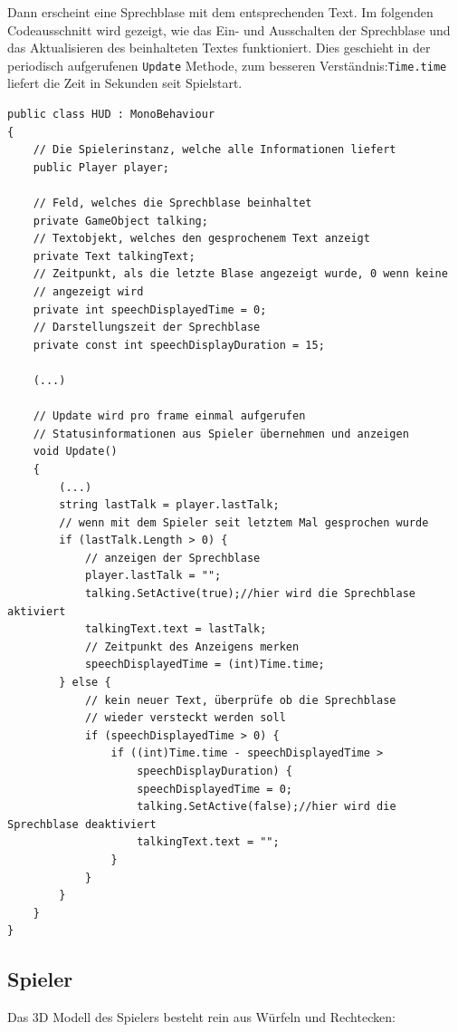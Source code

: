 Dann erscheint eine Sprechblase mit dem entsprechenden Text. Im folgenden Codeausschnitt wird gezeigt, wie das Ein- und Ausschalten der Sprechblase und  das Aktualisieren des beinhalteten Textes funktioniert. Dies geschieht in der periodisch aufgerufenen \lstinline{Update} Methode, zum besseren Verständnis:\lstinline{Time.time} liefert die Zeit in Sekunden seit Spielstart.

\begin{lstlisting}[caption={Sprechblase ein- und ausblenden}]
public class HUD : MonoBehaviour
{
	// Die Spielerinstanz, welche alle Informationen liefert
	public Player player;

	// Feld, welches die Sprechblase beinhaltet
	private GameObject talking;
	// Textobjekt, welches den gesprochenem Text anzeigt
	private Text talkingText;
	// Zeitpunkt, als die letzte Blase angezeigt wurde, 0 wenn keine 
	// angezeigt wird
	private int speechDisplayedTime = 0;
	// Darstellungszeit der Sprechblase
	private const int speechDisplayDuration = 15;

	(...)
	
	// Update wird pro frame einmal aufgerufen
	// Statusinformationen aus Spieler übernehmen und anzeigen
	void Update()
	{
		(...)
		string lastTalk = player.lastTalk;
		// wenn mit dem Spieler seit letztem Mal gesprochen wurde
		if (lastTalk.Length > 0) {
			// anzeigen der Sprechblase
			player.lastTalk = "";
			talking.SetActive(true);//hier wird die Sprechblase aktiviert
			talkingText.text = lastTalk;
			// Zeitpunkt des Anzeigens merken
			speechDisplayedTime = (int)Time.time;
		} else {
			// kein neuer Text, überprüfe ob die Sprechblase 
			// wieder versteckt werden soll
			if (speechDisplayedTime > 0) {
				if ((int)Time.time - speechDisplayedTime > 
					speechDisplayDuration) {
					speechDisplayedTime = 0;
					talking.SetActive(false);//hier wird die Sprechblase deaktiviert
					talkingText.text = "";
				}
			}
		}	
	}
}
\end{lstlisting}

\subsection{Spieler}

Das 3D Modell des Spielers besteht rein aus Würfeln und Rechtecken:

